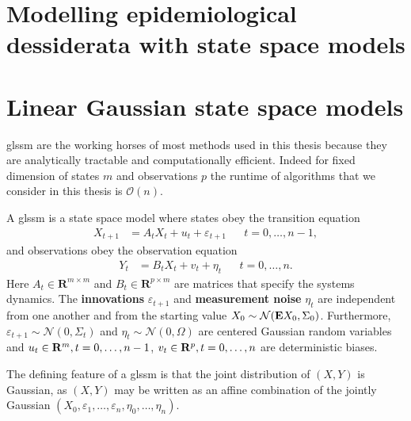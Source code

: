 \section{Modelling epidemiological dessiderata with state space models}
\label{sec:modelling_epidemiological_dessiderata_with_state_space_models}

\section{Linear Gaussian state space models}
\label{sec:linear_gaussian_state_space_models}

\gls{glssm} are the working horses of most methods used in this thesis because they are analytically tractable and computationally efficient. Indeed for fixed dimension of states $m$ and observations $p$ the runtime of algorithms that we consider in this thesis is $\mathcal O(n)$.

\begin{definition}
    \label{def:glssm}
    A \gls{glssm} is a state space model where states obey the transition equation
    \begin{align}
        \label{eq:glssm_states}
        X_{t + 1} & = A_{t}X_{t} + u_{t} + \varepsilon_{t + 1} &  & t = 0, \dots, n - 1,
    \end{align}
    and observations obey the observation equation
    \begin{align}
        \label{eq:glssm_observations}
        Y_{t} & = B_{t}X_{t} + v_{t} + \eta_{t} &  & t = 0, \dots, n.
    \end{align}
    Here $A_{t} \in \mathbf{R}^{m \times m}$ and $B_{t} \in \mathbf{R}^{p \times m}$ are matrices that specify the systems dynamics. The \textbf{innovations} $\varepsilon_{t + 1}$ and \textbf{measurement noise} $\eta_{t}$ are independent from one another and from the starting value $X_{0} \sim \mathcal N (\mathbf E X_{0}, \Sigma_{0})$. Furthermore, $\varepsilon_{t+1} \sim \mathcal N(0, \Sigma_{t})$ and $\eta_{t}\sim \mathcal N(0, \Omega)$ are centered Gaussian random variables and $u_{t} \in \mathbf R^{m}, t = 0, \dots, n - 1$, $v_{t} \in \mathbf R^{p}, t = 0, \dots, n$ are deterministic biases.
\end{definition}

The defining feature of a \gls{glssm} is that the joint distribution of $(X,Y)$ is Gaussian, as $(X,Y)$ may be written as an affine combination of the jointly Gaussian $(X_{0}, \varepsilon_{1}, \dots, \varepsilon_{n}, \eta_{0}, \dots, \eta_{n})$. 

